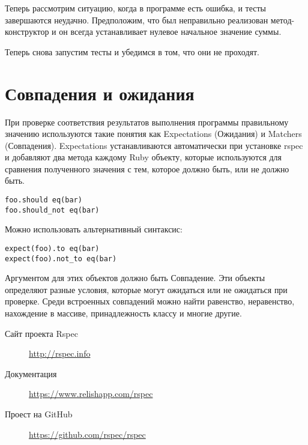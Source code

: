 

Теперь рассмотрим ситуацию, когда в программе есть ошибка, и тесты завершаются неудачно. Предположим, что был неправильно реализован метод-конструктор и он всегда устанавливает нулевое начальное значение суммы.



Теперь снова запустим тесты и убедимся в том, что они не проходят.




\section{Совпадения и ожидания}

При проверке соответствия результатов выполнения программы правильному значению используются такие понятия как Expectations (Ожидания) и Matchers (Совпадения). Expectations устанавливаются автоматически при установке rspec и добавляют два метода каждому Ruby объекту, которые используются для сравнения полученного значения с тем, которое должно быть, или не должно быть.

\begin{verbatim}
foo.should eq(bar)
foo.should_not eq(bar)
\end{verbatim}

Можно использовать альтернативный синтаксис:

\begin{verbatim}
expect(foo).to eq(bar)
expect(foo).not_to eq(bar) 
\end{verbatim}

Аргументом для этих объектов должно быть Совпадение. Эти объекты определяют разные условия, которые могут ожидаться или не ожидаться при проверке. Среди встроенных совпадений можно найти равенство, неравенство, нахождение в массиве, принадлежность классу и многие другие.

\begin{description}
\item[Сайт проекта Rspec] \url{http://rspec.info}
\item[Документация] \url{https://www.relishapp.com/rspec}
\item[Проест на GitHub] \url{https://github.com/rspec/rspec}
\end{description}
